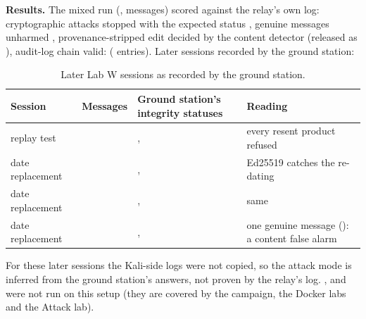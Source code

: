 \textbf{Results.} The mixed run (,  messages) scored against the relay's own log: cryptographic attacks stopped with the expected status , genuine messages unharmed ,  provenance-stripped edit decided by the content detector (released as ), audit-log chain valid:  ( entries). Later sessions recorded by the ground station:
\begin{table}[!htbp]
\centering\small
\begin{tabularx}{\textwidth}{|L{3.0cm}|L{2.0cm}|L{4.4cm}|Y|}
\hline
\textbf{Session} & \textbf{Messages} & \textbf{Ground station's integrity statuses} & \textbf{Reading}\\
\hline
replay test &  &  ,   & every resent product refused\\
\hline
date replacement &  &  ,   & Ed25519 catches the re-dating\\
\hline
date replacement &  &  ,   & same\\
\hline
date replacement &  &  ,   & one genuine message  (): a content false alarm\\
\hline
\end{tabularx}
\caption{Later Lab W sessions as recorded by the ground station.}
\end{table}
For these later sessions the Kali-side logs were not copied, so the attack mode is inferred from the ground station's answers, not proven by the relay's log. ,  and  were not run on this setup (they are covered by the campaign, the Docker labs and the Attack lab).


